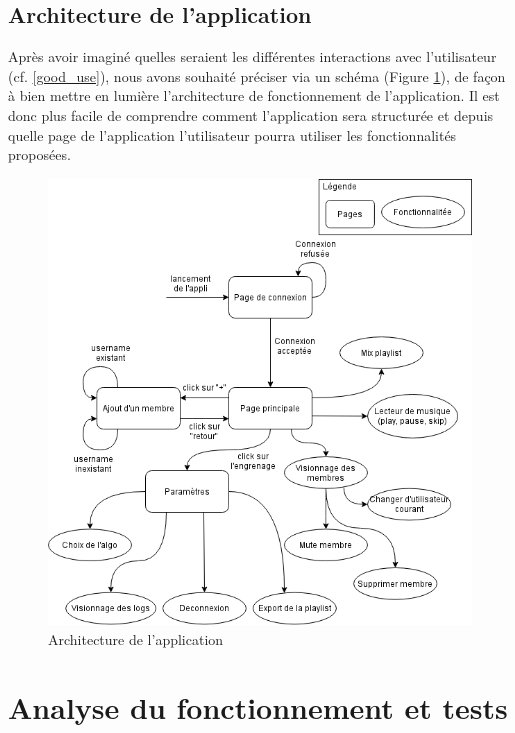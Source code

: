 \documentclass{article}
\begin{document}
		\subsection{Architecture de l'application}\label{archi_log}
        Après avoir imaginé quelles seraient les différentes interactions avec l'utilisateur (cf. \ref{good_use}), nous avons souhaité préciser via un schéma (Figure \ref{fig:arch_diag}), de façon à bien mettre en lumière l'architecture de fonctionnement de l'application. Il est donc plus facile de comprendre comment l'application sera structurée et depuis quelle page de l'application l'utilisateur pourra utiliser les fonctionnalités proposées.
		\begin{figure}[h!]
			\includegraphics[width=\linewidth]{ressources/Architecture_Log.png}
			\caption{Architecture de l'application}
			\label{fig:arch_diag}
		\end{figure}
	
	    \newpage
		\section{Analyse du fonctionnement et tests}
\end{document}
